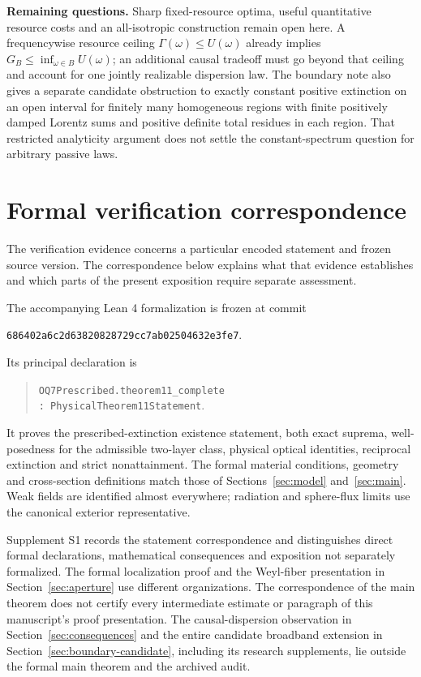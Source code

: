 \documentclass[11pt]{article}
\begin{document}
\noindent\textbf{Remaining questions.}
Sharp fixed-resource optima, useful quantitative resource costs and an all-isotropic construction remain open here. A frequencywise resource ceiling $\Gamma(\omega)\leq U(\omega)$ already implies $G_B\leq\inf_{\omega\in B}U(\omega)$; an additional causal tradeoff must go beyond that ceiling and account for one jointly realizable dispersion law. The boundary note also gives a separate candidate obstruction to exactly constant positive extinction on an open interval for finitely many homogeneous regions with finite positively damped Lorentz sums and positive definite total residues in each region. That restricted analyticity argument does not settle the constant-spectrum question for arbitrary passive laws.

\section{Formal verification correspondence}\label{sec:formal}
The verification evidence concerns a particular encoded statement and frozen source version. The correspondence below explains what that evidence establishes and which parts of the present exposition require separate assessment.

The accompanying Lean 4 formalization is frozen at commit
\begin{center}\small\texttt{686402a6c2d63820828729cc7ab02504632e3fe7}.\end{center}
Its principal declaration is
\begin{quote}
\texttt{OQ7Prescribed.theorem11\_complete}\\
\texttt{: PhysicalTheorem11Statement}.
\end{quote}
It proves the prescribed-extinction existence statement, both exact suprema, well-posedness for the admissible two-layer class, physical optical identities, reciprocal extinction and strict nonattainment. The formal material conditions, geometry and cross-section definitions match those of Sections~\ref{sec:model} and~\ref{sec:main}. Weak fields are identified almost everywhere; radiation and sphere-flux limits use the canonical exterior representative.

Supplement S1 records the statement correspondence and distinguishes direct formal declarations, mathematical consequences and exposition not separately formalized. The formal localization proof and the Weyl-fiber presentation in Section~\ref{sec:aperture} use different organizations. The correspondence of the main theorem does not certify every intermediate estimate or paragraph of this manuscript's proof presentation. The causal-dispersion observation in Section~\ref{sec:consequences} and the entire candidate broadband extension in Section~\ref{sec:boundary-candidate}, including its research supplements, lie outside the formal main theorem and the archived audit.
\end{document}
